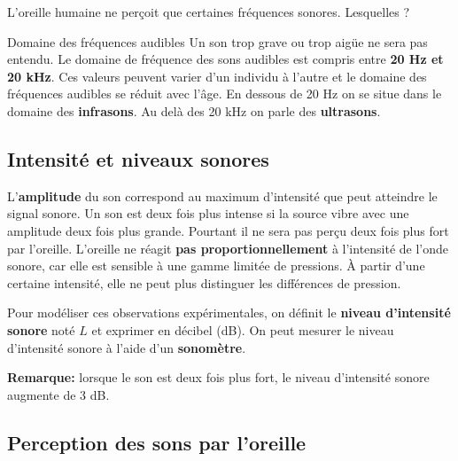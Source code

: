 \documentclass[french]{article}
\begin{document}
L'oreille humaine ne perçoit que certaines fréquences sonores. Lesquelles ?
\begin{definition}{Domaine des fréquences audibles}
Un son trop grave ou trop aigüe ne sera pas entendu. Le domaine de fréquence des sons audibles est compris entre \textbf{20 Hz et 20 kHz}. Ces valeurs peuvent varier d'un individu à l'autre et le domaine des fréquences audibles se réduit avec l'âge. En dessous de 20 Hz on se situe dans le domaine des \textbf{infrasons}. Au delà des 20 kHz on parle des \textbf{ultrasons}.
\end{definition}
\subsection{Intensité et niveaux sonores} 

L'\textbf{amplitude} du son correspond au maximum d'intensité que peut atteindre le signal sonore. Un son est deux fois plus intense si la source vibre avec une amplitude deux fois plus grande. Pourtant il ne sera pas perçu deux fois plus fort par l'oreille. L'oreille ne réagit \textbf{pas proportionnellement} à l'intensité de l'onde sonore, car elle est sensible à une gamme limitée de pressions. À partir d'une certaine intensité, elle ne peut plus distinguer les différences de pression.\bigskip

Pour modéliser ces observations expérimentales, on définit le \textbf{niveau d'intensité sonore} noté $L$ et exprimer en décibel (dB). On peut mesurer le niveau d'intensité sonore à l'aide d'un \textbf{sonomètre}.\medskip

\textbf{Remarque:} lorsque le son est deux fois plus fort, le niveau d'intensité sonore augmente de 3 dB.


\subsection{Perception des sons par l'oreille}
\end{document}
